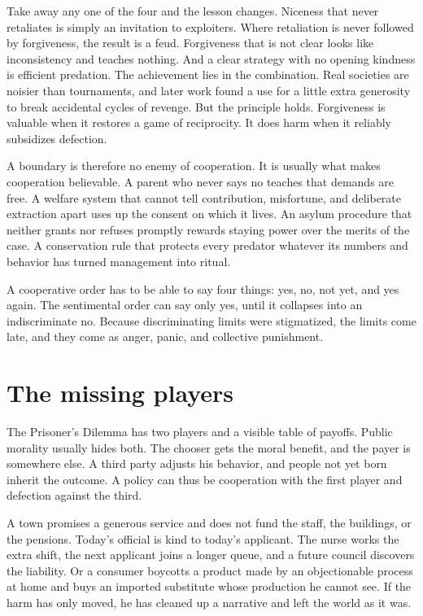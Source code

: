\documentclass[12pt,a4paper]{book}
\begin{document}
Take away any one of the four and the lesson changes. Niceness that never retaliates is simply an invitation to exploiters. Where retaliation is never followed by forgiveness, the result is a feud. Forgiveness that is not clear looks like inconsistency and teaches nothing. And a clear strategy with no opening kindness is efficient predation. The achievement lies in the combination. Real societies are noisier than tournaments, and later work found a use for a little extra generosity to break accidental cycles of revenge. But the principle holds. Forgiveness is valuable when it restores a game of reciprocity. It does harm when it reliably subsidizes defection.

A boundary is therefore no enemy of cooperation. It is usually what makes cooperation believable. A parent who never says no teaches that demands are free. A welfare system that cannot tell contribution, misfortune, and deliberate extraction apart uses up the consent on which it lives. An asylum procedure that neither grants nor refuses promptly rewards staying power over the merits of the case. A conservation rule that protects every predator whatever its numbers and behavior has turned management into ritual.

A cooperative order has to be able to say four things: yes, no, not yet, and yes again. The sentimental order can say only yes, until it collapses into an indiscriminate no. Because discriminating limits were stigmatized, the limits come late, and they come as anger, panic, and collective punishment.

\section{The missing players}

The Prisoner's Dilemma has two players and a visible table of payoffs. Public morality usually hides both. The chooser gets the moral benefit, and the payer is somewhere else. A third party adjusts his behavior, and people not yet born inherit the outcome. A policy can thus be cooperation with the first player and defection against the third.

A town promises a generous service and does not fund the staff, the buildings, or the pensions. Today's official is kind to today's applicant. The nurse works the extra shift, the next applicant joins a longer queue, and a future council discovers the liability. Or a consumer boycotts a product made by an objectionable process at home and buys an imported substitute whose production he cannot see. If the harm has only moved, he has cleaned up a narrative and left the world as it was.
\end{document}
